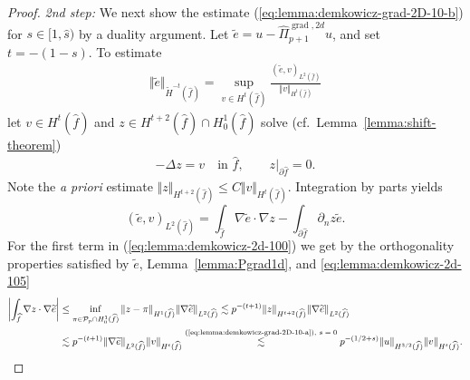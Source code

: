 \documentclass{article}
\newcommand{\hatPigradcomtwod}{\widehat\Pi^{\operatorname*{grad},2d}_{p+1}}
\begin{document}
\begin{proof}
\emph{2nd step:}
We next show 
the estimate (\ref{eq:lemma:demkowicz-grad-2D-10-b}) for $s \in [1,\widehat{s})$ by a duality argument. 
Let $\widetilde{e}=u-\hatPigradcomtwod u$, and set $t=-(1-s)$. To estimate 
\begin{align}
\label{eq:lemma:demkowicz-2d-15}
\Vert\widetilde{e}\Vert_{\widetilde{H}^{-t}(\widehat{f})} = \operatorname*{sup}_{v\in H^t(\widehat{f})} \frac{(\widetilde{e},v)_{L^2(\widehat{f})}}{\Vert v\Vert_{H^t(\widehat{f})}}
\end{align}
let $v\in H^t(\widehat{f})$ and $z\in H^{t+2}(\widehat{f})\cap H_{0}%
^{1}(\widehat{f})$ solve (cf.~Lemma~\ref{lemma:shift-theorem}) 
\begin{align*}
-\Delta z=v\quad\text{in }\widehat{f},\qquad z|_{\partial
\widehat{f}}=0.
\end{align*}
Note the \textsl{a priori} estimate $\Vert z\Vert_{H^{t+2}(\widehat{f})}\leq
C\Vert v\Vert_{H^t(\widehat{f})}$. Integration by parts
yields
\begin{equation}
(\widetilde{e},v)_{L^{2}(\widehat{f})}=\int_{\widehat{f}}%
\nabla\widetilde{e}\cdot\nabla z-\int_{\partial\widehat{f}}\partial
_{n}z\widetilde{e}. \label{eq:lemma:demkowicz-2d-100}%
\end{equation}
For the first term in (\ref{eq:lemma:demkowicz-2d-100}) we get by the
orthogonality properties satisfied by $\widetilde{e}$, 
Lemma~\ref{lemma:Pgrad1d}, and \eqref{eq:lemma:demkowicz-2d-105} 
\begin{align}
\nonumber 
 \left\vert \int_{\widehat{f}}\nabla z\cdot\nabla\widetilde{e}\right\vert  
& 
\leq\inf_{\pi\in{\mathcal{P}}_{p}\cap H_{0}^{1}(\widehat{f})}\Vert z-\pi
\Vert_{H^{1}(\widehat{f})}\Vert\nabla\widetilde{e}\Vert_{L^{2}(\widehat{f}%
)}
\lesssim p^{-(t+1)}\Vert z\Vert_{H^{t+2}(\widehat{f})}\Vert\nabla
\widetilde{e}\Vert_{L^{2}(\widehat{f})}  \\
\label{eq:lemma:demkowicz-2d-17}
&\lesssim p^{-(t+1)} \Vert\nabla
\widetilde{e}\Vert_{L^{2}(\widehat{f})} \Vert v\Vert_{H^t(\widehat{f})}  
\stackrel{\text{(\ref{eq:lemma:demkowicz-grad-2D-10-a}), $s=0$}}{\lesssim} p^{-(1/2+s)} \Vert u\Vert_{H^{3/2}(\widehat{f})} \Vert v\Vert_{H^t(\widehat{f})}.
\end{align}

\end{proof}
\end{document}
